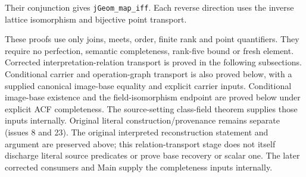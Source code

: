 \documentclass[11pt,oneside]{article}
\theoremstyle{definition}
\theoremstyle{remark}
\newcommand{\lean}[1]{\nolinkurl{#1}}
\begin{document}
Their conjunction gives \lean{jGeom_map_iff}. Each reverse direction uses the inverse
lattice isomorphism and bijective point transport.

These proofs use only joins, meets, order, finite rank and point quantifiers. They require
no perfection, semantic completeness, rank-five bound or fresh element. Corrected
interpretation-relation transport is proved in the following subsections. Conditional
carrier and operation-graph transport is also proved below, with a supplied canonical
image-base equality and explicit carrier inputs.
Conditional image-base existence and the field-isomorphism endpoint are proved below under
explicit ACF completeness. The source-setting class-field theorem supplies those inputs
internally. Original literal construction/provenance remains separate (issues 8 and 23).
The original interpreted reconstruction statement and argument are preserved above;
this relation-transport stage does not itself discharge literal source predicates
or prove base recovery or scalar one. The later corrected consumers and Main supply
the completeness inputs internally.
\end{document}
